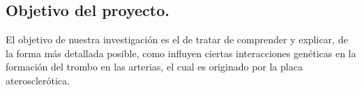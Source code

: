 \subsection{Objetivo del proyecto.}
El objetivo de nuestra investigación es el de tratar de comprender y explicar, de la forma más detallada posible, como influyen ciertas interacciones genéticas en la formación del trombo en las arterias, el cual es originado por la placa aterosclerótica.

